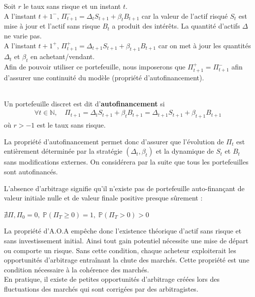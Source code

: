 \remark Soit $r$ le taux sans risque et un instant $t$.\\
A l'instant $t+1^-$, $\Pi^-_{t+1} = \Delta_tS_{t+1}+\beta_tB_{t+1}$ car la valeur de l'actif risqué $S_t$ est mise à jour et l'actif sans risque $B_t$ a produit des intérêts. La quantité d'actifs $\Delta$ ne varie pas. \\
A l'instant $t+1^+$, $\Pi^+_{t+1} = \Delta_{t+1}S_{t+1}+\beta_{t+1}B_{t+1}$ car on met à jour les quantités $\Delta_t$ et $\beta_t$ en achetant/vendant.\\
Afin de pouvoir utiliser ce portefeuille, nous imposerons que $\Pi^+_{t+1} = \Pi^-_{t+1}$ afin d'assurer une continuité du modèle (propriété d'autofinancement). \\ \\

\begin{definitionbox}[frametitle = {Propriété d'autofinancement}]
    Un portefeuille discret est dit d'\textbf{autofinancement} si
    \begin{align*}
        \forall t \in \mathbb{N},  \quad \Pi_{t+1} = \Delta_t S_{t+1} + \beta_tB_{t+1} = \Delta_{t+1}S_{t+1} + \beta_{t+1}B_{t+1}
    \end{align*}
    où $r > -1$ est le taux sans risque. \cite{SelfFinancingPortfolio}
\end{definitionbox}
\vspace{0.025\textheight}
La propriété d'autofinancement permet donc d'assurer que l'évolution de $\Pi_t$ est entièrement déterminée par la stratégie $(\Delta_t,\beta_t)$ et la dynamique de $S_t$ et $B_t$ sans modifications externes. On considérera par la suite que tous les portefeuilles sont autofinancés.
\vspace{0.025\textheight}\\

\begin{definitionbox}[frametitle = {Absence d'opportunité d'arbitrage (A.O.A.)}]
    L'absence d'arbitrage signifie qu'il n'existe pas de portefeuille auto-finançant 
    de valeur initiale nulle et de valeur finale positive presque sûrement : \\
    \begin{center}
         $\nexists \Pi, \Pi_0=0, \; \mathbb{P}(\Pi_T\geq0)=1, \; \mathbb{P}(\Pi_T > 0) > 0$
    \end{center}
\end{definitionbox}
\vspace{0.025\textheight}
\pagebreak
\remark La propriété d'A.O.A empêche donc l'existence théorique d'actif sans risque et sans investissement initial. Ainsi tout gain potentiel nécessite une mise de départ ou comporte un risque. Sans cette condition, chaque acheteur exploiterait les opportunités d'arbitrage entraînant la chute des marchés.
Cette propriété est une condition nécessaire à la cohérence des marchés. \\
En pratique, il existe de petites opportunités d'arbitrage créées lors des fluctuations des marchés qui sont corrigées par des arbitragistes.

